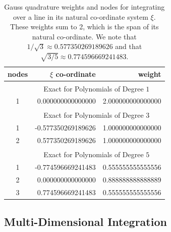 \begin{table}
    \centering
    \begin{tabular}{|c|rr|}
        \hline
        nodes & \centering $\xi$ co-ordinate \phantom{123}  & 
        weight \phantom{123456} \\ \hline
        & \multicolumn{2}{|c|}{Exact for Polynomials of Degree $1^{\phantom{|^|}}$} \\ 
        \hline
        1 & 0.000000000000000 & 2.000000000000000 \\ 
        \hline
        & \multicolumn{2}{|c|}{Exact for Polynomials of Degree $3^{\phantom{|^|}}$} \\ \hline
        1 & -0.577350269189626 & 1.000000000000000 \\
        2 & 0.577350269189626 & 1.000000000000000 \\ 
        \hline
        & \multicolumn{2}{|c|}{Exact for Polynomials of Degree $5^{\phantom{|^|}}$} \\ \hline
        1 & -0.774596669241483 & 0.555555555555556 \\
        2 & 0.000000000000000 & 0.888888888888889\\
        3 & 0.774596669241483 & 0.555555555555556\\ 
        \hline
    \end{tabular}
    \caption{Gauss quadrature weights and nodes for integrating over a line in its natural co-ordinate system $\xi$.  These weights sum to 2, which is the span of its natural co-ordinate.  We note that $1/\sqrt{3} \approx 0.577350269189626$ and that $\sqrt{3/5} \approx 0.774596669241483$.}
    \label{tabQuadrature1D}
\end{table}


\subsection{Multi-Dimensional Integration}

